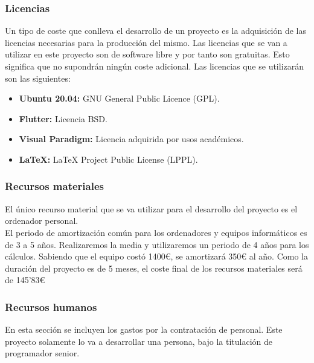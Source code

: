 \begin{adjustwidth}{2em}{0pt} %
	\subsubsection{Licencias}
	
	Un tipo de coste que conlleva el desarrollo de un proyecto es la adquisición de las licencias necesarias para la producción del mismo. Las licencias que se van a utilizar en este proyecto son de software libre y por tanto son gratuitas. Esto significa que no supondrán ningún coste adicional. Las licencias que se utilizarán son las siguientes: 

\newpage

	\begin{itemize}
		\item \textbf{Ubuntu 20.04:} GNU General Public Licence (GPL).
		\item \textbf{Flutter:} Licencia BSD. 
		\item \textbf{Visual Paradigm:} Licencia adquirida por usos académicos. 
		\item \textbf{LaTeX:} LaTeX Project Public License (LPPL).
	\end{itemize}
	
	
	\subsubsection{Recursos materiales}
	
	El único recurso material que se va utilizar para el desarrollo del proyecto es el ordenador personal. \\
	
	El periodo de amortización común para los ordenadores y equipos informáticos es de 3 a 5 años. Realizaremos la media y utilizaremos un periodo de 4 años para los cálculos. Sabiendo que el equipo costó 1400€, se amortizará 350€ al año. Como la duración del proyecto es de 5 meses, el coste final de los recursos materiales será de 145'83€
	
	\subsubsection{Recursos humanos}
	
	En esta sección se incluyen los gastos por la contratación de personal. Este proyecto solamente lo va a desarrollar una persona, bajo la titulación de programador senior. \\
	

\end{adjustwidth}
